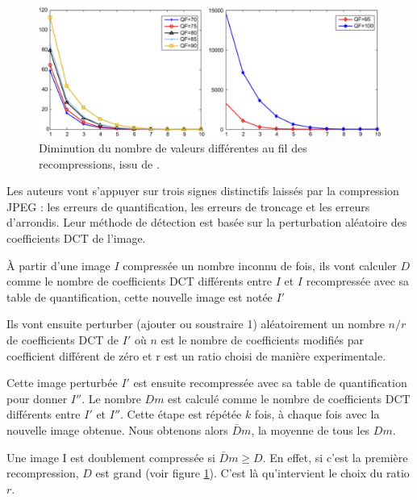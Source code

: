 \documentclass[utf8,final]{stageM2R} %
\begin{document}
\begin{figure}
  \begin{center}
    \includegraphics[width=130mm]{images/d_courbe}
    \caption{Diminution du nombre de valeurs différentes au fil des recompressions, issu de \autocite{huang2010detecting}.}
    \label{d_courbe}
  \end{center}
\end{figure}

Les auteurs vont s'appuyer sur trois signes distinctifs laissés par la compression JPEG : les erreurs de quantification, les erreurs de troncage et les erreurs d'arrondis. Leur méthode de détection est basée sur la perturbation aléatoire des coefficients DCT de l'image.

À partir d'une image $I$ compressée un nombre inconnu de fois, ils vont calculer $D$ comme le nombre de coefficients DCT différents entre $I$ et $I$ recompressée avec sa table de quantification, cette nouvelle image est notée $I'$

Ils vont ensuite perturber (ajouter ou soustraire 1) aléatoirement un nombre $n/r$ de coefficients DCT de $I'$ où $n$ est le nombre de coefficients modifiés par coefficient différent de zéro et r est un ratio choisi de manière experimentale.

Cette image perturbée $I'$ est ensuite recompressée avec sa table de quantification pour donner $I''$. Le nombre $Dm$ est calculé comme le nombre de coefficients DCT différents entre $I'$ et $I''$. Cette étape est répétée $k$ fois, à chaque fois avec la nouvelle image obtenue. Nous obtenons alors $\bar{D}m$, la moyenne de tous les $Dm$.

Une image I est doublement compressée si $\bar{D}m \geqslant D$. En effet, si c'est la première recompression, $D$ est grand (voir figure \ref{d_courbe}). C'est là qu'intervient le choix du ratio $r$. 
\end{document}
